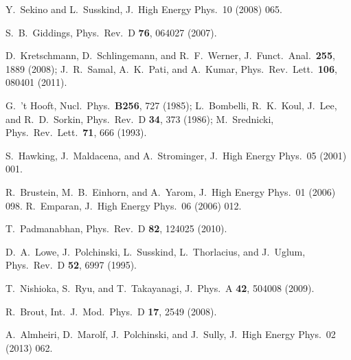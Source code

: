 \documentclass[twocolumn,aps,showpacs,prl]{revtex4}
\begin{document}
\begin{thebibliography}{16}
 Y.\ Sekino and L.\ Susskind,
J.\ High Energy Phys.\ 10 (2008) 065.

 S.\ B.\ Giddings,
Phys.\ Rev.\ D {\bf 76}, 064027 (2007).

 D.\ Kretschmann, D.\ Schlingemann, and R.\ F.\ Werner,
J.\ Funct.\ Anal.\ {\bf 255}, 1889 (2008);
J.\ R.\ Samal, A.\ K.\ Pati, and A.\ Kumar,
Phys.\ Rev.\ Lett.\ {\bf 106}, 080401 (2011).

 G.\ 't Hooft,
Nucl.\ Phys.\ {\bf B256}, 727 (1985);
%
L.\ Bombelli, 
R.\ K.\ Koul, J.\ Lee, and R.\ D.\ Sorkin,
Phys.\ Rev.\ D {\bf 34}, 373 (1986);
%
M.\ Srednicki,
Phys.\ Rev.\ Lett.\ {\bf 71}, 666 (1993).

S.\ Hawking, J.\ Maldacena, and A.\ Strominger,
J.\ High Energy Phys.\ 05 (2001) 001.

R.\ Brustein, M.\ B.\ Einhorn, and A.\ Yarom,
J.\ High Energy Phys.\ 01 (2006) 098.
%
R.\ Emparan,
J.\ High Energy Phys.\ 06 (2006) 012.

 T.\ Padmanabhan,
Phys.\ Rev.\ D {\bf 82}, 124025 (2010).


 D.\ A.\ Lowe,
J.\ Polchinski, L.\ Susskind, L.\ Thorlacius, and J.\ Uglum,
Phys.\ Rev.\ D {\bf 52}, 6997 (1995).


 T.\ Nishioka, S.\ Ryu, and T.\ Takayanagi,
J.\ Phys.\ A {\bf 42}, 504008 (2009).

 R.\ Brout,
Int.\ J.\ Mod.\ Phys.\ D {\bf 17}, 2549 (2008).

 A.\ Almheiri, 
D.\ Marolf, J.\ Polchinski, and J.\ Sully,
J.\ High Energy Phys.\ 02 (2013) 062.


\end{thebibliography}
\end{document}
